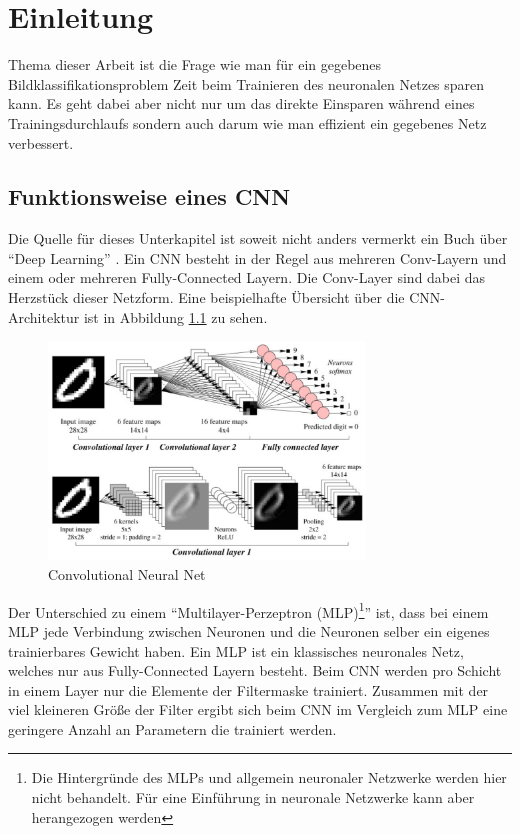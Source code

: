 \chapter{Einleitung}
\label{sec:EinleitungGesamt}

Thema dieser Arbeit ist die Frage wie man für ein gegebenes Bildklassifikationsproblem Zeit beim Trainieren des neuronalen Netzes sparen kann. Es geht dabei aber nicht nur um das direkte Einsparen während eines Trainingsdurchlaufs sondern auch darum wie man effizient ein gegebenes Netz verbessert.





\section{Funktionsweise eines CNN}\label{sec:conv}
Die Quelle für dieses Unterkapitel ist soweit nicht anders vermerkt ein Buch über \enquote{Deep Learning} \cite{CNNBook}.
Ein CNN besteht in der Regel aus mehreren Conv-Layern und einem oder mehreren Fully-Connected Layern. Die Conv-Layer sind dabei das Herzstück dieser Netzform. Eine beispielhafte Übersicht über die CNN-Architektur ist in Abbildung \ref{fig:cnn} zu sehen.


\begin{figure}[h]
  \centering
  \includegraphics[width=0.75\textwidth]{images/cnn.pdf}
  \caption{Convolutional Neural Net \cite{CNNImg}}
  \label{fig:cnn}
\end{figure}


Der Unterschied zu einem \enquote{Multilayer-Perzeptron (MLP)\footnote{Die Hintergründe des MLPs und allgemein neuronaler Netzwerke werden hier nicht behandelt. Für eine Einführung in neuronale Netzwerke kann aber \cite{neural} herangezogen werden}} ist, dass bei einem MLP jede Verbindung zwischen Neuronen und die Neuronen selber ein eigenes trainierbares Gewicht haben. Ein MLP ist ein klassisches neuronales Netz, welches nur aus Fully-Connected Layern besteht. Beim CNN werden pro Schicht in einem Layer nur die Elemente der Filtermaske trainiert. Zusammen mit der viel kleineren Größe der Filter ergibt sich beim CNN im Vergleich zum MLP eine geringere Anzahl an Parametern die trainiert werden.

